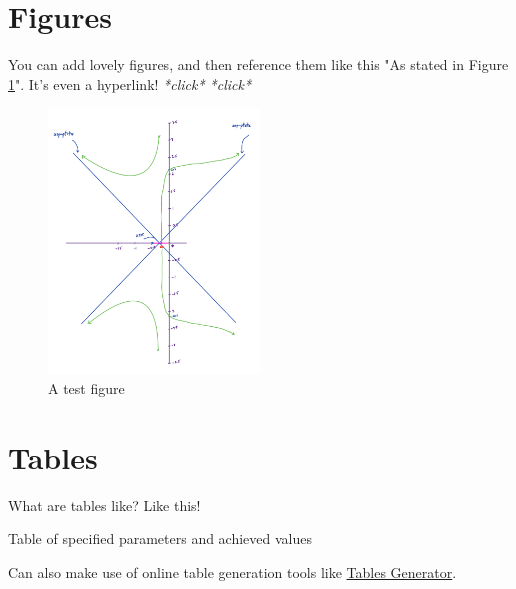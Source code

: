 \documentclass[hidelinks, 12pt]{article}%
\begin{document}
    \section{Figures}
        You can add lovely figures, and then reference them like this "As stated in Figure \ref{fig:test}".
        It's even a hyperlink! \textit{*click* *click*}
        \begin{figure}[H]
            \begin{centering}
                \includegraphics[width=0.5\textwidth]{images/rootLocus.png}
                \caption{A test figure}
                \label{fig:test}
            \end{centering}
        \end{figure}

    \section{Tables}
        What are tables like?
        Like this!
        \begin{table}[H]
            \centering
            \label{Table:Parameters}
            \caption{Table of specified parameters and achieved values}
        \end{table}
        Can also make use of online table generation tools like \href{https://www.tablesgenerator.com/}{Tables Generator}.
\end{document}
